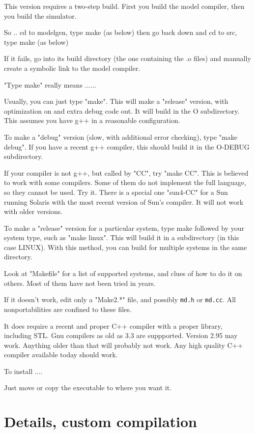 This version requires a two-step build.  First you build the model
compiler, then you build the simulator.

So ..
cd to modelgen, type make (as below)
then go back down and cd to src, type make (as below)

If it fails, go into its build directory (the one containing the .o
files) and manually create a symbolic link to the model compiler.


"Type make" really means ......

Usually, you can just type "make".  This will make a "release"
version, with optimization on and extra debug code out.  It will build
in the O subdirectory.  This assumes you have g++ in a reasonable
configuration.

To make a "debug" version (slow, with additional error checking), type
"make debug".  If you have a recent g++ compiler, this should build it
in the O-DEBUG subdirectory.

If your compiler is not g++, but called by "CC", try "make CC".  This
is believed to work with some compilers.  Some of them do not
implement the full language, so they cannot be used.  Try it.  There
is a special one "sun4-CC" for a Sun running Solaris with the most
recent version of Sun's compiler.  It will not work with older
versions.

To make a "release" version for a particular system, type make
followed by your system type, such as "make linux".  This will build
it in a subdirectory (in this case LINUX).  With this method, you can
build for multiple systems in the same directory.

Look at "Makefile" for a list of supported systems, and clues of how
to do it on others.  Most of them have not been tried in years.

If it doesn't work, edit only a "Make2.*" file, and possibly {\tt md.h} or
{\tt md.cc}.  All nonportabilities are confined to these files.

It does require a recent and proper C++ compiler with a proper
library, including STL.  Gnu compilers as old as 3.3 are suppported.
Version 2.95 may work.  Anything older than that will probably not
work.  Any high quality C++ compiler available today should work.

To install ....

Just move or copy the executable to where you want it.

\section{Details, custom compilation}

